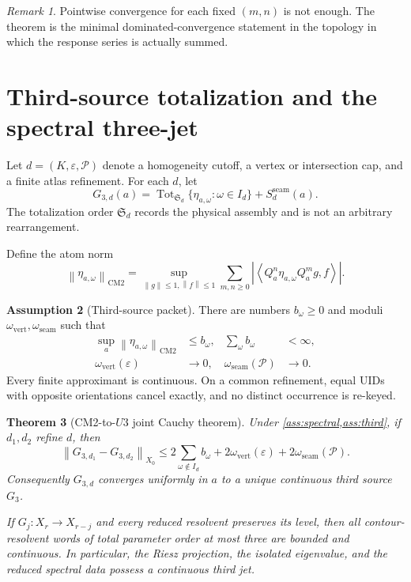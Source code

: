 \documentclass[11pt,reqno]{amsart}
\newtheorem{theorem}{Theorem}[section]
\theoremstyle{definition}
\newtheorem{assumption}[theorem]{Assumption}
\theoremstyle{remark}
\newtheorem{remark}[theorem]{Remark}
\newcommand{\Tot}{\operatorname{Tot}}
\newcommand{\norm}[1]{\left\lVert #1\right\rVert}
\newcommand{\abs}[1]{\left\lvert #1\right\rvert}
\newcommand{\pair}[2]{\left\langle #1,#2\right\rangle}
\begin{document}
\begin{remark}
Pointwise convergence for each fixed $(m,n)$ is not enough.  The theorem is the
minimal dominated-convergence statement in the topology in which the response
series is actually summed.
\end{remark}

\section{Third-source totalization and the spectral three-jet}\label{sec:u3}

Let $d=(K,\varepsilon,\mathcal P)$ denote a homogeneity cutoff, a vertex or
intersection cap, and a finite atlas refinement.  For each $d$, let
\begin{equation}\label{eq:G3d}
 G_{3,d}(a)=
 \Tot_{\mathfrak S_d}\{\eta_{a,\omega}:\omega\in I_d\}
 +S_{d}^{\mathrm{seam}}(a).
\end{equation}
The totalization order $\mathfrak S_d$ records the physical assembly and is not
an arbitrary rearrangement.

Define the atom norm
\begin{equation}\label{eq:atom-norm}
 \norm{\eta_{a,\omega}}_{\mathrm{CM2}}
 =\sup_{\norm{g}\le1,\norm{f}\le1}
 \sum_{m,n\ge0}
 \abs{\pair{Q_a^n\eta_{a,\omega}Q_a^m g}{f}}.
\end{equation}

\begin{assumption}[Third-source packet]\label{ass:third}
There are numbers $b_\omega\ge0$ and moduli
$\omega_{\mathrm{vert}},\omega_{\mathrm{seam}}$ such that
\begin{align*}
 \sup_a\norm{\eta_{a,\omega}}_{\mathrm{CM2}}&\le b_\omega,
 &\sum_\omega b_\omega&<\infty,\\
 \omega_{\mathrm{vert}}(\varepsilon)&\longrightarrow0,
 &\omega_{\mathrm{seam}}(\mathcal P)&\longrightarrow0.
\end{align*}
Every finite approximant is continuous.  On a common refinement, equal UIDs
with opposite orientations cancel exactly, and no distinct occurrence is
re-keyed.
\end{assumption}

\begin{theorem}[CM2-to-$U3$ joint Cauchy theorem]\label{thm:u3}
Under \cref{ass:spectral,ass:third}, if $d_1,d_2$ refine $d$, then
\begin{equation}\label{eq:cauchy}
 \norm{G_{3,d_1}-G_{3,d_2}}_{X_0}
 \le 2\sum_{\omega\notin I_d}b_\omega
 +2\omega_{\mathrm{vert}}(\varepsilon)
 +2\omega_{\mathrm{seam}}(\mathcal P).
\end{equation}
Consequently $G_{3,d}$ converges uniformly in $a$ to a unique continuous third
source $G_3$.

If $G_j:X_r\to X_{r-j}$ and every reduced resolvent preserves its level, then
all contour-resolvent words of total parameter order at most three are bounded
and continuous.  In particular, the Riesz projection, the isolated
eigenvalue, and the reduced spectral data possess a continuous third jet.
\end{theorem}
\end{document}
